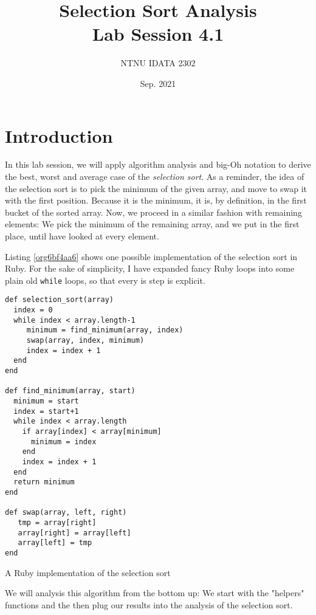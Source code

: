 \documentclass[11pt]{article}
\author{NTNU IDATA 2302}
\date{Sep. 2021}
\title{Selection Sort Analysis\\\medskip
\large Lab Session 4.1}
\begin{document}
\maketitle
\tableofcontents




\section{Introduction}
\label{sec:orgf5da430}

In this lab session, we will apply algorithm analysis and big-Oh
notation to derive the best, worst and average case of the \emph{selection
sort}.  As a reminder, the idea of the selection sort is to pick the
minimum of the given array, and move to swap it with the first
position. Because it is the minimum, it is, by definition, in the
first bucket of the sorted array. Now, we proceed in a similar fashion
with remaining elements: We pick the minimum of the remaining array,
and we put in the first place, until have looked at every element.

Listing \ref{org6bf4aa6} shows one possible implementation of the
selection sort in Ruby. For the sake of simplicity, I have expanded
fancy Ruby loops into some plain old \texttt{while} loops, so that every is
step is explicit.

\begin{listing}[htbp]
\begin{verbatim}
def selection_sort(array)                 
  index = 0                               
  while index < array.length-1            
     minimum = find_minimum(array, index) 
     swap(array, index, minimum)          
     index = index + 1                    
  end
end

def find_minimum(array, start)   
  minimum = start                
  index = start+1                
  while index < array.length     
    if array[index] < array[minimum] 
      minimum = index                
    end
    index = index + 1                
  end
  return minimum   
end                

def swap(array, left, right)
   tmp = array[right]       
   array[right] = array[left] 
   array[left] = tmp          
end                           
\end{verbatim}
\caption{\label{org6bf4aa6}A Ruby implementation of the selection sort}
\end{listing}

We will analysis this algorithm from the bottom up: We start with the
"helpers" functions and the then plug our results into the analysis of
the selection sort.
\end{document}
